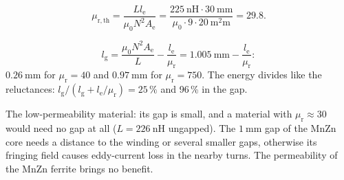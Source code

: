 


\begin{solutionblock}
	\begin{equation}
		\mu_\mathrm{r,th}=\frac{Ll_\mathrm{e}}{\mu_0N^2A_\mathrm{e}}=\frac{\SI{225}{\nano\henry}\cdot\SI{30}{\milli\metre}}{\mu_0\cdot9\cdot\SI{20}{\square\milli\metre}}=29.8.
	\end{equation}
\end{solutionblock}


\begin{solutionblock}
	\begin{equation}
		l_\mathrm{g}=\frac{\mu_0N^2A_\mathrm{e}}{L}-\frac{l_\mathrm{e}}{\mu_\mathrm{r}}=\SI{1.005}{\milli\metre}-\frac{l_\mathrm{e}}{\mu_\mathrm{r}}:
	\end{equation}
	$\SI{0.26}{\milli\metre}$ for $\mu_\mathrm{r}=40$ and $\SI{0.97}{\milli\metre}$ for $\mu_\mathrm{r}=750$. The energy divides like the reluctances: $l_\mathrm{g}/(l_\mathrm{g}+l_\mathrm{e}/\mu_\mathrm{r})=25\,\%$ and 96\,\% in the gap.
\end{solutionblock}


\begin{solutionblock}
	The low-permeability material: its gap is small, and a material with $\mu_\mathrm{r}\approx30$ would need no gap at all ($L=\SI{226}{\nano\henry}$ ungapped). The $\SI{1}{\milli\metre}$ gap of the MnZn core needs a distance to the winding or several smaller gaps, otherwise its fringing field causes eddy-current loss in the nearby turns. The permeability of the MnZn ferrite brings no benefit.
\end{solutionblock}



